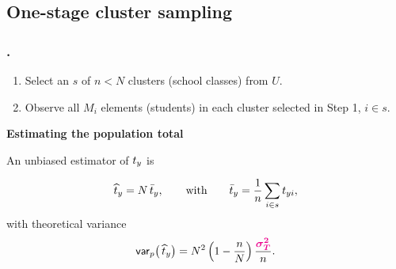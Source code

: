 \documentclass{my_eth_beamer}
\numberwithin{equation}{section}
\begin{document}
\subsection{One-stage cluster sampling}

\begin{frame}
    \frametitle{\insertsectionnumber.\insertsubsectionnumber~\insertsubsection}
    \begin{enumerate}[1)]
    \setlength{\itemsep}{6pt}
        \item Select an \SRS $s$ of $n<N$ \alert{clusters} (school classes)
            from $U$.
        \item \alert{Observe all} $M_i$ elements (students) in each cluster
            selected in Step 1, $i\in s$.
    \end{enumerate}

    \vspace{1.5em}

    \textbf{\textcolor{fhnwblue}{Estimating the population total}}

    \vspace{0.5em}

    An unbiased \alert{estimator} of $t_y$ is

    \vspace{-0.25em}

    \begin{equation*}
        \widehat{t}_y = N \, \bar{t}_y, \qquad \text{with} \qquad
            \bar{t}_y = \frac{1}{n}\sum_{i \in s} t_{yi},
    \end{equation*}
    \noindent with theoretical \alert{variance}
    \begin{equation*}
        \mathsf{var}_p\big(\,\widehat{t}_y\big) = N^2 \left(1 - \frac{n}{N}\right)
            \frac{{\color{magenta}\bm{\sigma}_{\bm{T}}^{\bm{2}}}}{n}.
    \end{equation*}
\end{frame}
\end{document}
